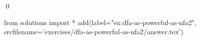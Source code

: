 
\begin{ex} 
  \label{ex:dfa-as-powerful-as-nfa2}
  
  \qed
\end{ex} 
\begin{python0}
from solutions import *
add(label="ex:dfa-as-powerful-as-nfa2",
    srcfilename='exercises/dfa-as-powerful-as-nfa2/answer.tex') 
\end{python0}
